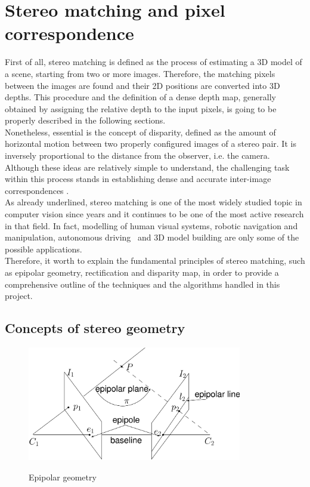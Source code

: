 \section{Stereo matching and pixel correspondence}
\label{section:stereo-match-and-corr}

First of all, stereo matching is defined as the process of estimating a 3D model of a scene, starting from two or more images. 
Therefore, the matching pixels between the images are found and their 2D positions are converted into 3D depths. 
This procedure and the definition of a dense depth map, generally obtained by assigning the relative depth to the input pixels, is going to be properly described in the following sections.\\
Nonetheless, essential is the concept of disparity, defined as the amount of horizontal motion between two properly configured images of a stereo pair. 
It is inversely proportional to the distance from the observer, i.e. the camera. 
Although these ideas are relatively simple to understand, the challenging task within this process stands in establishing dense and accurate inter-image correspondences \cite{Szeliski2011}.\\
As already underlined, stereo matching is one of the most widely studied topic in computer vision since years and it continues to be one of the most active research in that field. 
In fact, modelling of human visual systems, robotic navigation and manipulation, autonomous driving~\cite{Poggi2019} and 3D model building are only some of the possible applications.\\
Therefore, it worth to explain the fundamental principles of stereo matching, such as epipolar geometry, rectification and disparity map, in order to provide a comprehensive outline of the techniques and the algorithms handled in this project.

\subsection{Concepts of stereo geometry}
\label{subsection:stereo-geometry-basics}

\begin{figure}[t]
	\begin{center}
		{\includegraphics[width=.8\textwidth, height=5cm, keepaspectratio]{images/epipolar-geometry}}
\caption{Epipolar geometry}
\label{fig:epipolargeom}
	\end{center}
\end{figure}

